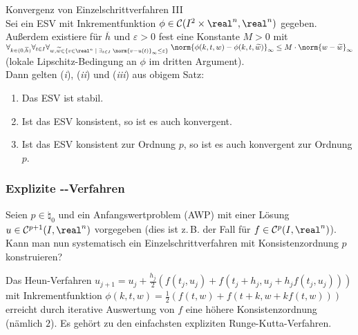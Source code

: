 \begin{Satz}{Konvergenz von Einzelschrittverfahren III}\\
    Sei ein ESV mit Inkrementfunktion
    $\phi \in \C(I^2 \times \real^n, \real^n)$ gegeben.
    Außerdem existiere für $\overline{h}$ und $\varepsilon > 0$ fest
    eine Konstante $M > 0$ mit\\
    $\forall_{k \in (0, \overline{h})}
    \forall_{t \in I} \forall_{w, \widetilde{w} \in
    \{v \in \real^n \;|\;
    \exists_{t \in I}\; \norm{v - u(t)}_\infty \le \varepsilon\}}\;
    \norm{\phi(k, t, w) - \phi(k, t, \widetilde{w})}_\infty \le
    M \cdot \norm{w - \widetilde{w}}_\infty$\\
    (lokale Lipschitz-Bedingung an $\phi$ im dritten Argument).\\
    Dann gelten (\emph{i}), (\emph{ii}) und (\emph{iii}) aus obigem Satz:
    \begin{enumerate}[label=(\emph{\roman*})]
        \item
        Das ESV ist stabil.

        \item
        Ist das ESV konsistent, so ist es auch konvergent.

        \item
        Ist das ESV konsistent zur Ordnung $p$, so ist es auch konvergent zur
        Ordnung $p$.
    \end{enumerate}
\end{Satz}

\pagebreak

\subsubsection{%
    Explizite --Verfahren%
}

\begin{Bem}
    Seien $p \in \natural_0$ und ein Anfangswertproblem (AWP) mit einer
    Lösung\\
    $u \in \C^{p+1}(I, \real^n)$ vorgegeben
    (dies ist z.\,B. der Fall für $f \in \C^p(I, \real^n)$).\\
    Kann man nun systematisch ein Einzelschrittverfahren mit
    Konsistenzordnung $p$ konstruieren?
\end{Bem}

\begin{Bsp}
    Das Heun-Verfahren $u_{j+1} = u_j + \frac{h_j}{2}
    (f(t_j, u_j) + f(t_j + h_j, u_j + h_j f(t_j, u_j)))$
    mit Inkrementfunktion
    $\phi(k, t, w) = \frac{1}{2} (f(t, w) + f(t + k, w + k f(t, w)))$
    erreicht durch iterative Auswertung von $f$ eine höhere Konsistenzordnung
    (nämlich $2$).
    Es gehört zu den einfachsten expliziten Runge-Kutta-Verfahren.
\end{Bsp}

